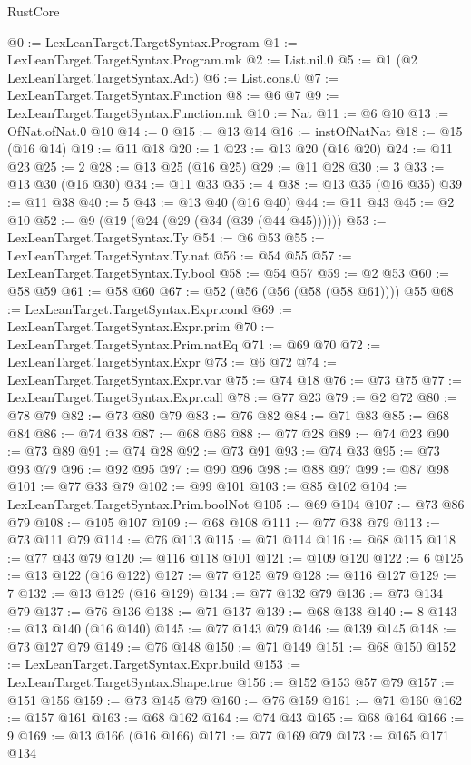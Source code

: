\begin{lexlean}{RustCore}
\begin{coremodule}
@0 := LexLeanTarget.TargetSyntax.Program
@1 := LexLeanTarget.TargetSyntax.Program.mk
@2 := List.nil.{0}
@5 := @1 (@2 LexLeanTarget.TargetSyntax.Adt)
@6 := List.cons.{0}
@7 := LexLeanTarget.TargetSyntax.Function
@8 := @6 @7
@9 := LexLeanTarget.TargetSyntax.Function.mk
@10 := Nat
@11 := @6 @10
@13 := OfNat.ofNat.{0} @10
@14 := 0
@15 := @13 @14
@16 := instOfNatNat
@18 := @15 (@16 @14)
@19 := @11 @18
@20 := 1
@23 := @13 @20 (@16 @20)
@24 := @11 @23
@25 := 2
@28 := @13 @25 (@16 @25)
@29 := @11 @28
@30 := 3
@33 := @13 @30 (@16 @30)
@34 := @11 @33
@35 := 4
@38 := @13 @35 (@16 @35)
@39 := @11 @38
@40 := 5
@43 := @13 @40 (@16 @40)
@44 := @11 @43
@45 := @2 @10
@52 := @9 (@19 (@24 (@29 (@34 (@39 (@44 @45))))))
@53 := LexLeanTarget.TargetSyntax.Ty
@54 := @6 @53
@55 := LexLeanTarget.TargetSyntax.Ty.nat
@56 := @54 @55
@57 := LexLeanTarget.TargetSyntax.Ty.bool
@58 := @54 @57
@59 := @2 @53
@60 := @58 @59
@61 := @58 @60
@67 := @52 (@56 (@56 (@58 (@58 @61)))) @55
@68 := LexLeanTarget.TargetSyntax.Expr.cond
@69 := LexLeanTarget.TargetSyntax.Expr.prim
@70 := LexLeanTarget.TargetSyntax.Prim.natEq
@71 := @69 @70
@72 := LexLeanTarget.TargetSyntax.Expr
@73 := @6 @72
@74 := LexLeanTarget.TargetSyntax.Expr.var
@75 := @74 @18
@76 := @73 @75
@77 := LexLeanTarget.TargetSyntax.Expr.call
@78 := @77 @23
@79 := @2 @72
@80 := @78 @79
@82 := @73 @80 @79
@83 := @76 @82
@84 := @71 @83
@85 := @68 @84
@86 := @74 @38
@87 := @68 @86
@88 := @77 @28
@89 := @74 @23
@90 := @73 @89
@91 := @74 @28
@92 := @73 @91
@93 := @74 @33
@95 := @73 @93 @79
@96 := @92 @95
@97 := @90 @96
@98 := @88 @97
@99 := @87 @98
@101 := @77 @33 @79
@102 := @99 @101
@103 := @85 @102
@104 := LexLeanTarget.TargetSyntax.Prim.boolNot
@105 := @69 @104
@107 := @73 @86 @79
@108 := @105 @107
@109 := @68 @108
@111 := @77 @38 @79
@113 := @73 @111 @79
@114 := @76 @113
@115 := @71 @114
@116 := @68 @115
@118 := @77 @43 @79
@120 := @116 @118 @101
@121 := @109 @120
@122 := 6
@125 := @13 @122 (@16 @122)
@127 := @77 @125 @79
@128 := @116 @127
@129 := 7
@132 := @13 @129 (@16 @129)
@134 := @77 @132 @79
@136 := @73 @134 @79
@137 := @76 @136
@138 := @71 @137
@139 := @68 @138
@140 := 8
@143 := @13 @140 (@16 @140)
@145 := @77 @143 @79
@146 := @139 @145
@148 := @73 @127 @79
@149 := @76 @148
@150 := @71 @149
@151 := @68 @150
@152 := LexLeanTarget.TargetSyntax.Expr.build
@153 := LexLeanTarget.TargetSyntax.Shape.true
@156 := @152 @153 @57 @79
@157 := @151 @156
@159 := @73 @145 @79
@160 := @76 @159
@161 := @71 @160
@162 := @157 @161
@163 := @68 @162
@164 := @74 @43
@165 := @68 @164
@166 := 9
@169 := @13 @166 (@16 @166)
@171 := @77 @169 @79
@173 := @165 @171 @134

\end{coremodule}
\end{lexlean}

